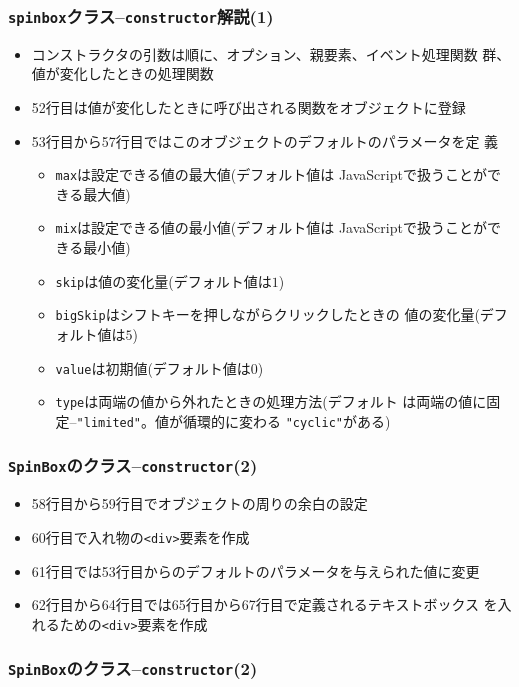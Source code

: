  \begin{frame}[containsverbatim]
  \frametitle{\texttt{spinbox}クラス--\texttt{constructor}解説(1)}
\begin{itemize}
 \item コンストラクタの引数は順に、オプション、親要素、イベント処理関数
       群、値が変化したときの処理関数
 \item 52行目は値が変化したときに呼び出される関数をオブジェクトに登録
 \item 53行目から57行目ではこのオブジェクトのデフォルトのパラメータを定
       義
       \begin{itemize}
        \item \texttt{max}は設定できる値の最大値(デフォルト値は
              JavaScriptで扱うことができる最大値)
        \item \texttt{mix}は設定できる値の最小値(デフォルト値は
              JavaScriptで扱うことができる最小値)
        \item \texttt{skip}は値の変化量(デフォルト値は$1$)
        \item \texttt{bigSkip}はシフトキーを押しながらクリックしたときの
              値の変化量(デフォルト値は$5$)
        \item \texttt{value}は初期値(デフォルト値は$0$)
        \item \texttt{type}は両端の値から外れたときの処理方法(デフォルト
              は両端の値に固定--\texttt{"limited"}。値が循環的に変わる
              \texttt{"cyclic"}がある)
       \end{itemize}
\end{itemize}
 \end{frame}
 \begin{frame}[containsverbatim]
  \frametitle{\texttt{SpinBox}のクラス--\texttt{constructor}(2)}
 \begin{itemize}
  \item 58行目から59行目でオブジェクトの周りの余白の設定
  \item 60行目で入れ物の\texttt{<div>}要素を作成
 \item 61行目では53行目からのデフォルトのパラメータを与えられた値に変更
 \item 62行目から64行目では65行目から67行目で定義されるテキストボックス
       を入れるための\texttt{<div>}要素を作成
 \end{itemize}
 \end{frame}
 \begin{frame}[containsverbatim]
  \frametitle{\texttt{SpinBox}のクラス--\texttt{constructor}(2)}
 \end{frame}
